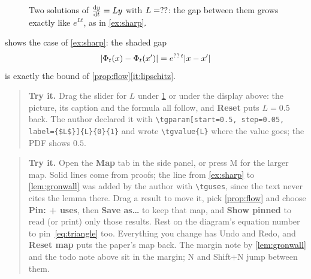 \documentclass{amsart}
\theoremstyle{definition}
\theoremstyle{remark}
\numberwithin{equation}{section}
\newenvironment{tryit}{\begin{quote}\small\textbf{Try it.}}{\end{quote}}
\begin{document}
%
\begin{figure}[ht]
\centering
{}
\caption{Two solutions of $\dv{y}{t} = L y$ with $L = \tgvalue{L}$: the gap
between them grows exactly like $e^{Lt}$, as in \cref{ex:sharp}.}
\label{fig:flow}
\end{figure}

 shows the case of \cref{ex:sharp}: the shaded gap
\[
  \abs{\Phi_t(x) - \Phi_t(x')} = e^{\tgvalue{L}\, t} \abs{x - x'}
\]
is exactly the bound of
\cref{prop:flow}\ref{it:lipschitz}.

\begin{tgonly}
\begin{tryit}
Drag the slider for $L$ under \cref{fig:flow} or under the display above:
the picture, its caption and the formula all follow, and \textbf{Reset}
puts $L = 0.5$ back. The author declared it with
\verb|\tgparam[start=0.5, step=0.05, label={$L$}]{L}{0}{1}| and wrote
\verb|\tgvalue{L}| where the value goes; the PDF shows $0.5$.
\end{tryit}
\end{tgonly}

\begin{tgonly}
\begin{tryit}
Open the \textbf{Map} tab in the side panel, or press M for the larger map.
Solid lines come from proofs; the line from \cref{ex:sharp} to
\cref{lem:gronwall} was added by the author with \verb|\tguses|, since the
text never cites the lemma there. Drag a result to move it, pick
\cref{prop:flow} and choose \textbf{Pin: + uses}, then \textbf{Save as\dots}
to keep that map, and \textbf{Show pinned} to read (or print) only those
results. Rest on the diagram's equation number to pin~\eqref{eq:triangle}
too. Everything you change has Undo and Redo, and \textbf{Reset map} puts the
paper's map back. The margin note by \cref{lem:gronwall} and the todo note
above sit in the margin; N and Shift+N jump between them.
\end{tryit}
\end{tgonly}
\end{document}
